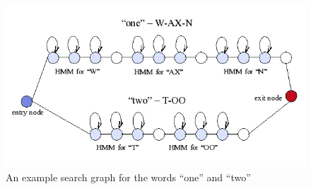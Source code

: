 \begin{figure}[htbp]
  \centering
    \includegraphics[width=1.0\textwidth]{images/hmm.png}
 \caption{An example search graph for the words ``one'' and ``two''}
  \label{fig:hmm}
\end {figure}



